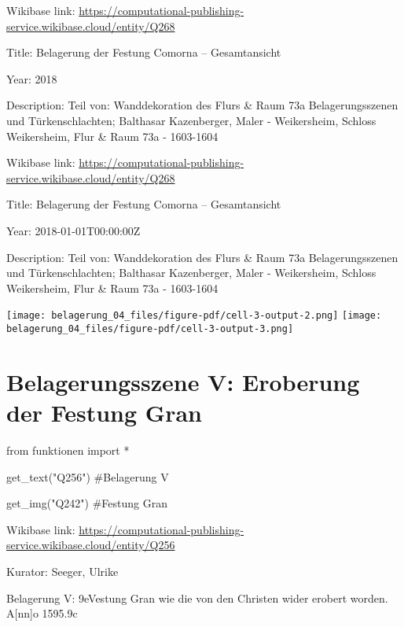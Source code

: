 \documentclass[
  a4paper,
  portrait]{book}
\newenvironment{Shaded}{\begin{snugshade}}{\end{snugshade}}
\newcommand{\CommentTok}[1]{\textcolor[rgb]{0.37,0.37,0.37}{#1}}
\newcommand{\ImportTok}[1]{\textcolor[rgb]{0.00,0.46,0.62}{#1}}
\newcommand{\NormalTok}[1]{\textcolor[rgb]{0.00,0.23,0.31}{#1}}
\newcommand{\OperatorTok}[1]{\textcolor[rgb]{0.37,0.37,0.37}{#1}}
\newcommand{\StringTok}[1]{\textcolor[rgb]{0.13,0.47,0.30}{#1}}
\begin{document}
Wikibase link:
\url{https://computational-publishing-service.wikibase.cloud/entity/Q268}

Title: Belagerung der Festung Comorna -- Gesamtansicht

Year: 2018

Description: Teil von: Wanddekoration des Flurs \& Raum 73a
Belagerungsszenen und Türkenschlachten; Balthasar Kazenberger, Maler -
Weikersheim, Schloss Weikersheim, Flur \& Raum 73a - 1603-1604

Wikibase link:
\url{https://computational-publishing-service.wikibase.cloud/entity/Q268}

Title: Belagerung der Festung Comorna -- Gesamtansicht

Year: 2018-01-01T00:00:00Z

Description: Teil von: Wanddekoration des Flurs \& Raum 73a
Belagerungsszenen und Türkenschlachten; Balthasar Kazenberger, Maler -
Weikersheim, Schloss Weikersheim, Flur \& Raum 73a - 1603-1604

\texttt{[image: belagerung\_04\_files/figure-pdf/cell-3-output-2.png]}
\texttt{[image: belagerung\_04\_files/figure-pdf/cell-3-output-3.png]}

\chapter{Belagerungsszene V: Eroberung der Festung
Gran}\label{belagerungsszene-v-eroberung-der-festung-gran}

\begin{Shaded}
\begin{Highlighting}[]
\ImportTok{from}\NormalTok{ funktionen }\ImportTok{import} \OperatorTok{*}
\end{Highlighting}
\end{Shaded}

\begin{Shaded}
\begin{Highlighting}[]
\NormalTok{get\_text(}\StringTok{"Q256"}\NormalTok{)}
\CommentTok{\#Belagerung V}

\NormalTok{get\_img(}\StringTok{"Q242"}\NormalTok{)}
\CommentTok{\#Festung Gran}
\end{Highlighting}
\end{Shaded}

Wikibase link:
\url{https://computational-publishing-service.wikibase.cloud/entity/Q256}

Kurator: Seeger, Ulrike

Belagerung V: \x9eVestung Gran wie die von den Christen wider
erobert worden. A{[}nn{]}o 1595.\x9c
\end{document}
